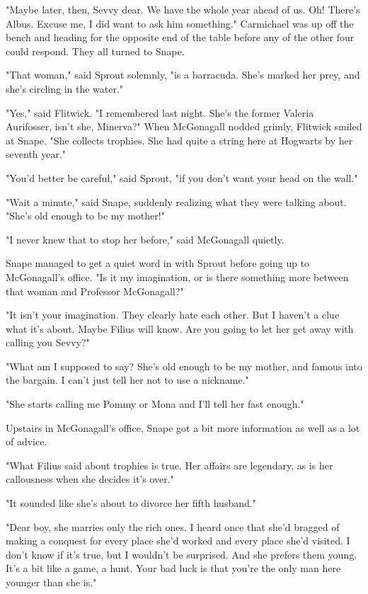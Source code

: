 "Maybe later, then, Sevvy dear. We have the whole year ahead of us. Oh! There's Albus. Excuse me, I did want to ask him something." Carmichael was up off the bench and heading for the opposite end of the table before any of the other four could respond. They all turned to Snape.

"That woman," said Sprout solemnly, "is a barracuda. She's marked her prey, and she's circling in the water."

"Yes," said Flitwick. "I remembered last night. She's the former Valeria Aurifosser, isn't she, Minerva?" When McGonagall nodded grimly, Flitwick smiled at Snape. "She collects trophies. She had quite a string here at Hogwarts by her seventh year."

"You'd better be careful," said Sprout, "if you don't want your head on the wall."

"Wait a minute," said Snape, suddenly realizing what they were talking about. "She's old enough to be my mother!"

"I never knew that to stop her before," said McGonagall quietly.

Snape managed to get a quiet word in with Sprout before going up to McGonagall's office. "Is it my imagination, or is there something more between that woman and Professor McGonagall?"

"It isn't your imagination. They clearly hate each other. But I haven't a clue what it's about. Maybe Filius will know. Are you going to let her get away with calling you Sevvy?"

"What am I supposed to say? She's old enough to be my mother, and famous into the bargain. I can't just tell her not to use a nickname."

"She starts calling me Pommy or Mona and I'll tell her fast enough."

Upstairs in McGonagall's office, Snape got a bit more information as well as a lot of advice.

"What Filius said about trophies is true. Her affairs are legendary, as is her callousness when she decides it's over."

"It sounded like she's about to divorce her fifth husband."

"Dear boy, she marries only the rich ones. I heard once that she'd bragged of making a conquest for every place she'd worked and every place she'd visited. I don't know if it's true, but I wouldn't be surprised. And she prefers them young. It's a bit like a game, a hunt. Your bad luck is that you're the only man here younger than she is."

